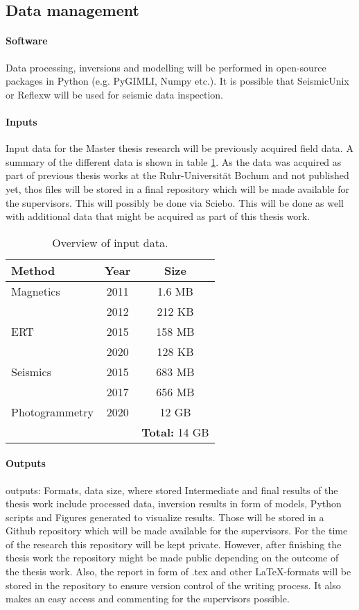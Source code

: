 \subsection{Data management}\label{section:Data_management}

\paragraph*{Software}
Data processing, inversions and modelling will be performed in open-source packages in Python (e.g. PyGIMLI, Numpy etc.). It is possible that SeismicUnix or Reflexw will be used for seismic data inspection.

\paragraph*{Inputs}
Input data for the Master thesis research will be previously acquired field data. A summary of the different data is shown in table \ref{table:Input_data}. As the data was acquired as part of previous thesis works at the Ruhr-Universität Bochum and not published yet, thos files will be stored in a final repository which will be made available for the supervisors. This will possibly be done via Sciebo. This will be done as well with additional data that might be acquired as part of this thesis work.

\begin{table}[!htb]
\caption{Overview of input data.}
\centering
\begin{tabular}{lcc}
\hline 
\textbf{Method} & \textbf{Year} & \textbf{Size}  \\ \hline 
Magnetics & 2011 & 1.6 MB\\
& 2012 & 212 KB\\
ERT & 2015 & 158 MB\\
& 2020 & 128 KB\\
Seismics & 2015 & 683 MB\\
& 2017 & 656 MB\\
Photogrammetry & 2020 & 12 GB\\
& & \textbf{Total:} 14 GB\\
 \hline 
\end{tabular}
\label{table:Input_data}
\end{table}

\paragraph*{Outputs}outputs: Formats, data size, where stored
Intermediate and final results of the thesis work include processed data, inversion results in form of models, Python scripts and Figures generated to visualize results. Those will be stored in a Github repository which will be made available for the supervisors. For the time of the research this repository will be kept private. However, after finishing the thesis work the repository might be made public depending on the outcome of the thesis work. Also, the report in form of .tex and other \LaTeX-formats will be stored in the repository to ensure version control of the writing process. It also makes an easy access and commenting for the supervisors possible.
